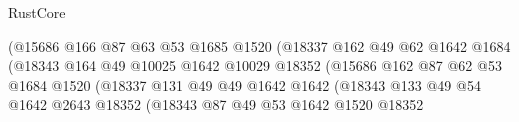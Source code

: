 \begin{lexlean}{RustCore}
\begin{coremodule}
                                          (@15686
                                            @166
                                            @87
                                            @63
                                            @53
                                            @1685
                                            @1520
                                            (@18337
                                              @162
                                              @49
                                              @62
                                              @1642
                                              @1684
                                              (@18343
                                                @164
                                                @49
                                                @10025
                                                @1642
                                                @10029
                                                @18352
                                                (@15686
                                                  @162
                                                  @87
                                                  @62
                                                  @53
                                                  @1684
                                                  @1520
                                                  (@18337
                                                    @131
                                                    @49
                                                    @49
                                                    @1642
                                                    @1642
                                                    (@18343
                                                      @133
                                                      @49
                                                      @54
                                                      @1642
                                                      @2643
                                                      @18352
                                                      (@18343
                                                        @87
                                                        @49
                                                        @53
                                                        @1642
                                                        @1520
                                                        @18352

\end{coremodule}
\end{lexlean}
